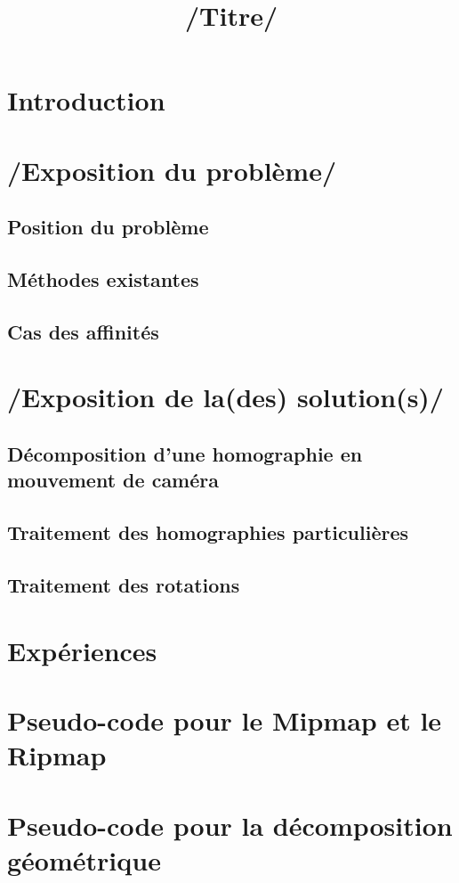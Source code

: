 \documentclass[a4paper,11pt]{article}
\title{/Titre/}
\begin{document}
   	\maketitle
	\tableofcontents
	
	\section*{Introduction}
		
	\section{/Exposition du problème/}
		\subsection{Position du problème}
		\subsection{Méthodes existantes}
		\subsection{Cas des affinités}
	\section{/Exposition de la(des) solution(s)/}
		\subsection{Décomposition d'une homographie en mouvement de caméra}
		\subsection{Traitement des homographies particulières}
		\subsection{Traitement des rotations}
	\section{Expériences}
		
	\appendix
	\section{Pseudo-code pour le Mipmap et le Ripmap}
	\section{Pseudo-code pour la décomposition géométrique}
	\nocite{*}
	
	
\end{document}
